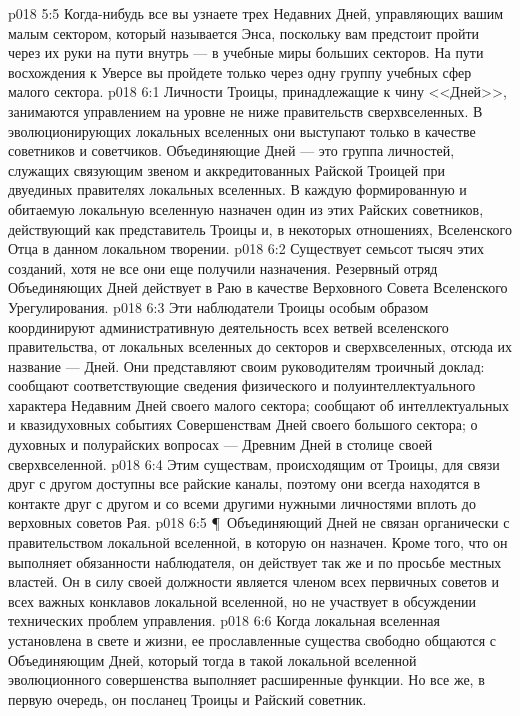 \vs p018 5:5 Когда\hyp{}нибудь все вы узнаете трех Недавних Дней, управляющих вашим малым сектором, который называется Энса, поскольку вам предстоит пройти через их руки на пути внутрь --- в учебные миры больших секторов. На пути восхождения к Уверсе вы пройдете только через одну группу учебных сфер малого сектора.
\vs p018 6:1 Личности Троицы, принадлежащие к чину <<Дней>>, занимаются управлением на уровне не ниже правительств сверхвселенных. В эволюционирующих локальных вселенных они выступают только в качестве советников и советчиков. Объединяющие Дней --- это группа личностей, служащих связующим звеном и аккредитованных Райской Троицей при двуединых правителях локальных вселенных. В каждую формированную и обитаемую локальную вселенную назначен один из этих Райских советников, действующий как представитель Троицы и, в некоторых отношениях, Вселенского Отца в данном локальном творении.
\vs p018 6:2 Существует семьсот тысяч этих созданий, хотя не все они еще получили назначения. Резервный отряд Объединяющих Дней действует в Раю в качестве Верховного Совета Вселенского Урегулирования.
\vs p018 6:3 Эти наблюдатели Троицы особым образом координируют административную деятельность всех ветвей вселенского правительства, от локальных вселенных до секторов и сверхвселенных, отсюда их название ---  Дней. Они представляют своим руководителям троичный доклад: сообщают соответствующие сведения физического и полуинтеллектуального характера Недавним Дней своего малого сектора; сообщают об интеллектуальных и квазидуховных событиях Совершенствам Дней своего большого сектора; о духовных и полурайских вопросах --- Древним Дней в столице своей сверхвселенной.
\vs p018 6:4 Этим существам, происходящим от Троицы, для связи друг с другом доступны все райские каналы, поэтому они всегда находятся в контакте друг с другом и со всеми другими нужными личностями вплоть до верховных советов Рая.
\vs p018 6:5 \P\ Объединяющий Дней не связан органически с правительством локальной вселенной, в которую он назначен. Кроме того, что он выполняет обязанности наблюдателя, он действует так же и по просьбе местных властей. Он в силу своей должности является членом всех первичных советов и всех важных конклавов локальной вселенной, но не участвует в обсуждении технических проблем управления.
\vs p018 6:6 Когда локальная вселенная установлена в свете и жизни, ее прославленные существа свободно общаются с Объединяющим Дней, который тогда в такой локальной вселенной эволюционного совершенства выполняет расширенные функции. Но все же, в первую очередь, он посланец Троицы и Райский советник.
